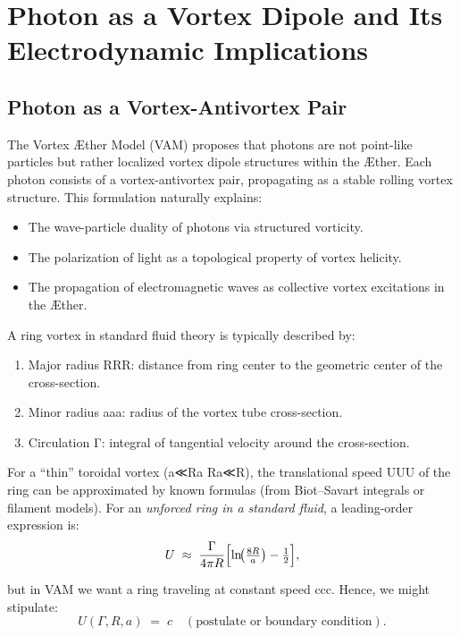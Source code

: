 

\section{Photon as a Vortex Dipole and Its Electrodynamic Implications}

\subsection{Photon as a Vortex-Antivortex Pair}
The Vortex \AE ther Model (VAM) proposes that photons are not point-like particles but rather localized vortex dipole structures within the \AE ther. Each photon consists of a vortex-antivortex pair, propagating as a stable rolling vortex structure. This formulation naturally explains:
\begin{itemize}
    \item The wave-particle duality of photons via structured vorticity.
    \item The polarization of light as a topological property of vortex helicity.
    \item The propagation of electromagnetic waves as collective vortex excitations in the \AE ther.
\end{itemize}


A ring vortex in standard fluid theory is typically described by:


\begin{enumerate}

\item Major radius RRR: distance from ring center to the geometric center of the cross-section.

\item Minor radius aaa: radius of the vortex tube cross-section.

\item Circulation Γ: integral of tangential velocity around the cross-section.

\end{enumerate}

For a “thin” toroidal vortex (a≪Ra \ll Ra≪R), the translational speed UUU of the ring can be approximated by known formulas (from Biot–Savart integrals or filament models). For an \textit{unforced ring in a standard fluid}, a leading-order expression is:
$$ U
\;\approx\;
\frac{\Gamma}{4\pi R}
\Bigl[\ln\!\bigl(\tfrac{8R}{a}\bigr) - \tfrac12\Bigr], $$

but in VAM we want a ring traveling at constant speed ccc. Hence, we might stipulate:
$$ U(\Gamma, R, a)
\;=\;
c
\quad
(\text{postulate or boundary condition}). $$

